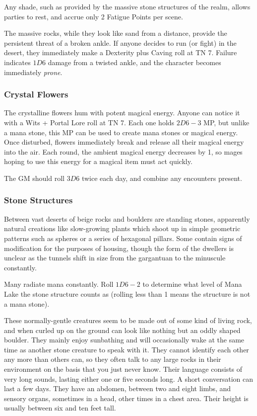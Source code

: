 \begin{multicols}{2}
Any shade, such as provided by the massive stone structures of the realm, allows parties to rest, and accrue only 2 Fatigue Points per scene.

The massive rocks, while they look like sand from a distance, provide the persistent threat of a broken ankle.
If anyone decides to run (or fight) in the desert, they immediately make a Dexterity plus Caving roll at TN 7.
Failure indicates $1D6$ damage from a twisted ankle, and the character becomes immediately \emph{prone}.

\subsubsection{Crystal Flowers}

The crystalline flowers hum with potent magical energy.
Anyone can notice it with a Wits + Portal Lore roll at TN 7.
Each one holds $2D6-3$ MP, but unlike a mana stone, this MP can be used to create mana stones or magical energy.
Once disturbed, flowers immediately break and release all their magical energy into the air.
Each round, the ambient magical energy decreases by 1, so mages hoping to use this energy for a magical item must act quickly.

The GM should roll $3D6$ twice each day, and combine any encounters present.

\subsubsection{Stone Structures}

Between vast deserts of beige rocks and boulders are standing stones, apparently natural creations like slow-growing plants which shoot up in simple geometric patterns such as spheres or a series of hexagonal pillars.
Some contain signs of modification for the purposes of housing, though the form of the dwellers is unclear as the tunnels shift in size from the gargantuan to the minuscule constantly.

Many radiate mana constantly.
Roll $1D6-2$ to determine what level of Mana Lake the stone structure counts as (rolling less than 1 means the structure is not a mana stone).

\label{rockman}

These normally-gentle creatures seem to be made out of some kind of living rock, and when curled up on the ground can look like nothing but an oddly shaped boulder.
They mainly enjoy sunbathing and will occasionally wake at the same time as another stone creature to speak with it.
They cannot identify each other any more than others can, so they often talk to any large rocks in their environment on the basis that you just never know.
Their language consists of very long sounds, lasting either one or five seconds long.
A short conversation can last a few days.
They have an abdomen, between two and eight limbs, and sensory organs, sometimes in a head, other times in a chest area.
Their height is usually between six and ten feet tall.


\end{multicols}
